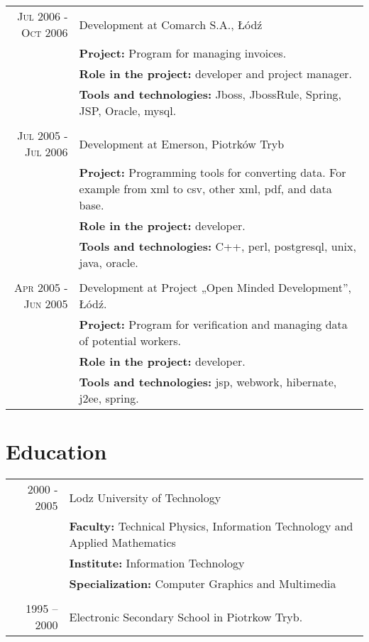 \documentclass[a4paper,9pt]{article} %
\begin{document}
\begin{longtable}{r|p{11cm}}
\textsc{Jul 2006 - Oct 2006} & Development at Comarch S.A., Łódź\\
& \textbf{Project:} Program for managing invoices.\\
& \textbf{Role in the project:} developer and project manager.\\
& \textbf{Tools and technologies:} Jboss, JbossRule, Spring, JSP, Oracle, mysql.\\
\multicolumn{2}{c}{} \\

\textsc{Jul 2005 - Jul 2006} & Development at Emerson, Piotrków Tryb\\
& \textbf{Project:} Programming tools for converting data. For example from xml to csv, other xml, pdf, and data base.\\
& \textbf{Role in the project:} developer.\\
& \textbf{Tools and technologies:} C++, perl, postgresql, unix, java, oracle.\\
\multicolumn{2}{c}{} \\

\textsc{Apr 2005 - Jun 2005} & Development at Project „Open Minded Development”, Łódź.\\
& \textbf{Project:} Program for verification and managing data of potential workers.\\
& \textbf{Role in the project:} developer.\\
& \textbf{Tools and technologies:} jsp, webwork, hibernate, j2ee, spring.\\

\end{longtable}



\section{Education}

\begin{longtable}{r|l}
\textsc{2000 - 2005} & Lodz University of Technology\\
& \textbf{Faculty:} Technical Physics, Information Technology and Applied Mathematics\\
& \textbf{Institute:} Information Technology\\
& \textbf{Specialization:} Computer Graphics and Multimedia\\
\multicolumn{2}{c}{} \\

\textsc{1995 – 2000} & Electronic Secondary School in Piotrkow Tryb.\\

\end{longtable}
\end{document}

